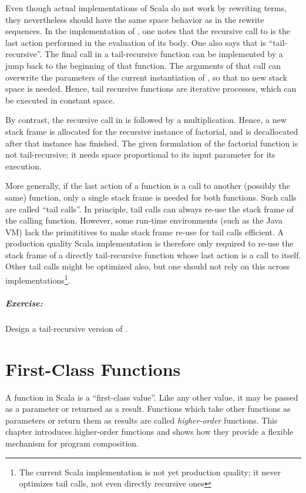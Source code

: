 \documentclass[a4paper,12pt,twoside,titlepage]{book}
\newcommand{\exercise}{\paragraph{Exercise:}}
\begin{document}
Even though actual implementations of Scala do not work by rewriting
terms, they nevertheless should have the same space behavior as in the
rewrite sequences. In the implementation of , one notes that
the recursive call to  is the last action performed in the
evaluation of its body. One also says that  is
``tail-recursive''. The final call in a tail-recursive function can be
implemented by a jump back to the beginning of that function. The
arguments of that call can overwrite the parameters of the current
instantiation of , so that no new stack space is needed.
Hence, tail recursive functions are iterative processes, which can be
executed in constant space.

By contrast, the recursive call in  is followed by a
multiplication.  Hence, a new stack frame is allocated for the
recursive instance of factorial, and is decallocated after that
instance has finished. The given formulation of the factorial function
is not tail-recursive; it needs space proportional to its input
parameter for its execution.

More generally, if the last action of a function is a call to another
(possibly the same) function, only a single stack frame is needed for
both functions. Such calls are called ``tail calls''. In principle,
tail calls can always re-use the stack frame of the calling function.
However, some run-time environments (such as the Java VM) lack the
primititives to make stack frame re-use for tail calls efficient.  A
production quality Scala implementation is therefore only required to re-use
the stack frame of a directly tail-recursive function whose last
action is a call to itself.  Other tail calls might be optimized also,
but one should not rely on this across
implementations\footnote{The current Scala implementation is not yet
production quality; it never optimizes tail calls, not even directly
recursive ones}.

\exercise Design a tail-recursive version of
.

\chapter{\label{chap:first-class-funs}First-Class Functions}

A function in Scala is a ``first-class value''. Like any other value,
it may be passed as a parameter or returned as a result.  Functions
which take other functions as parameters or return them as results are
called {\em higher-order} functions. This chapter introduces
higher-order functions and shows how they provide a flexible mechanism
for program composition.
\end{document}
